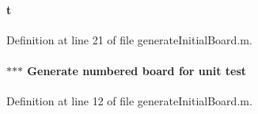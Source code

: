 \paragraph[{t}]{\setlength{\rightskip}{0pt plus 5cm}t}\label{a00107_aaccc9105df5383111407fd5b41255e23}


Definition at line 21 of file generate\+Initial\+Board.\+m.

\hypertarget{a00107_ab52c919104cfd3fd5aef89c5e39ec637}{}
\paragraph[{test}]{\setlength{\rightskip}{0pt plus 5cm}$\ast$$\ast$$\ast$ Generate numbered board for unit test}\label{a00107_ab52c919104cfd3fd5aef89c5e39ec637}


Definition at line 12 of file generate\+Initial\+Board.\+m.

